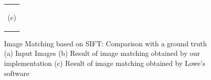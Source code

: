 \documentclass{article}
\begin{document}
\begin{figure}[p]
\begin{center}
\begin{tabular}{@{} c @{}}
\begin{minipage}{1.0\hsize}
\begin{center}
          (c)
        \end{center}
      \end{minipage}    \\
    \end{tabular}
    \caption{
      Image Matching based on SIFT: Comparison with a ground truth
      (a) Input Images
      (b) Result of image matching obtained by our implementation
      (c) Result of image matching obtained by Lowe's software \cite{dLowe05}
    }
    \label{Fi:MATCH}
  \end{center}
\end{figure} 

\begin{figure}[p]
  \begin{center}
    \begin{tabular}{@{} c @{}}


\end{tabular}
\end{center}
\end{figure}
\end{document}
